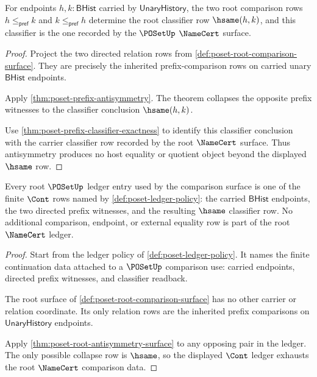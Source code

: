 \begin{theorem}\label{thm:poset-root-antisymmetry-surface}
For endpoints $h,k:\mathsf{BHist}$ carried by $\mathsf{UnaryHistory}$, the two
root comparison rows $h\le_{\mathsf{pref}}k$ and
$k\le_{\mathsf{pref}}h$ determine the root classifier row $\hsame(h,k)$, and
this classifier is the one recorded by the $\POSetUp$ $\NameCert$ surface.
\end{theorem}
\begin{proof}
Project the two directed relation rows from
\autoref{def:poset-root-comparison-surface}. They are precisely the inherited
prefix-comparison rows on carried unary $\mathsf{BHist}$ endpoints.

Apply \autoref{thm:poset-prefix-antisymmetry}. The theorem collapses the
opposite prefix witnesses to the classifier conclusion $\hsame(h,k)$.

Use \autoref{thm:poset-prefix-classifier-exactness} to identify this
classifier conclusion with the carrier classifier row recorded by the root
$\NameCert$ surface. Thus antisymmetry produces no host equality or quotient
object beyond the displayed $\hsame$ row.
\end{proof}

\begin{theorem}\label{thm:poset-root-ledger-exhaustion-surface}
Every root $\POSetUp$ ledger entry used by the comparison surface is one of
the finite $\Cont$ rows named by \autoref{def:poset-ledger-policy}: the
carried $\mathsf{BHist}$ endpoints, the two directed prefix witnesses, and
the resulting $\hsame$ classifier row. No additional comparison, endpoint, or
external equality row is part of the root $\NameCert$ ledger.
\end{theorem}
\begin{proof}
Start from the ledger policy of \autoref{def:poset-ledger-policy}. It names
the finite continuation data attached to a $\POSetUp$ comparison use: carried
endpoints, directed prefix witnesses, and classifier readback.

The root surface of \autoref{def:poset-root-comparison-surface} has no other
carrier or relation coordinate. Its only relation rows are the inherited
prefix comparisons on $\mathsf{UnaryHistory}$ endpoints.

Apply \autoref{thm:poset-root-antisymmetry-surface} to any opposing pair in
the ledger. The only possible collapse row is $\hsame$, so the displayed
$\Cont$ ledger exhausts the root $\NameCert$ comparison data.
\end{proof}

